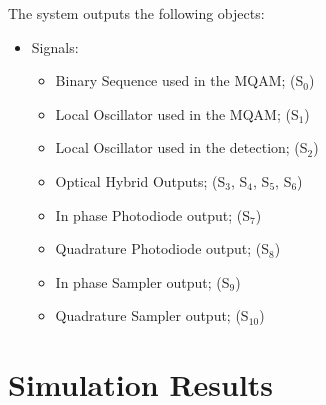 \documentclass[a4paper]{article}
\begin{document}
The system outputs the following objects:
\begin{itemize}
\item Signals:
\begin{itemize}
\item Binary Sequence used in the MQAM; (S$_{0}$)
\item Local Oscillator used in the MQAM; (S$_{1}$)
\item Local Oscillator used in the detection; (S$_{2}$)
\item Optical Hybrid Outputs; (S$_{3}$, S$_{4}$, S$_{5}$, S$_{6}$)
\item In phase Photodiode output; (S$_{7}$)
\item Quadrature Photodiode output; (S$_{8}$)
\item In phase Sampler output; (S$_{9}$)
\item Quadrature Sampler output; (S$_{10}$)
\end{itemize}
\end{itemize}	

\section{Simulation Results}\label{subsec:SHresults}
\end{document}
